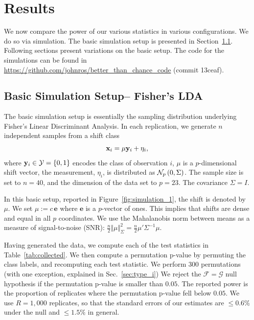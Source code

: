 \documentclass[oupdraft]{bio}
\begin{document}
\section{Results}
\label{sec:results}
We now compare the power of our various statistics in various configurations. 
We do so via simulation.
The basic simulation setup is presented in Section~\ref{sec:simulation_details}.
Following sections present variations on the basic setup.
The \R code for the simulations can be found in \url{https://github.com/johnros/better_than_chance_code} (commit 13ceaf).


\subsection{Basic Simulation Setup-- Fisher's LDA}
\label{sec:simulation_details}

The basic simulation setup is essentially the sampling distribution underlying Fisher's Linear Discriminant Analysis. 
In each replication, we generate $n$ independent samples from a shift class 
\begin{align}
\label{eq:distribution}
\mathbf{x}_i = \mu \mathbf{y}_i + \eta_i,
\end{align}
where $\mathbf{y}_i \in \mathcal{Y}=\{ 0,1 \}$ encodes the class of observation $i$, $\mu$ is a $p$-dimensional shift vector, the measurement, $\eta_i$, is distributed as $\mathcal{N}_{p}\left(0,\Sigma\right)$.
The sample size is set to $n=40$, and the dimension of the data set to $p=23$. 
The covariance $\Sigma=I$. 

In this basic setup, reported in Figure~\ref{fig:simulation_1}, the shift is denoted by $\mu$. 
We set $\mu:=c \, \textbf{e}$ where $\textbf{e}$ is a $p$-vector of ones. 
This implies that shifts are dense and equal in all $p$ coordinates.
We use the Mahalanobis norm between means as a measure of signal-to-noise (SNR): 
$\frac{n}{2}\Vert \mu \Vert_\Sigma^2=\frac{n}{2} \mu' \Sigma^{-1} \mu$.

Having generated the data, we compute each of the test statistics in Table~\ref{tab:collected}.
We then compute a permutation p-value by permuting the class labels, and recomputing each test statistic. 
We perform $300$ permutations (with one exception, explained in Sec.~\ref{sec:type_i})
We reject the $\mathcal{F}=\mathcal{G}$ null hypothesis if the permutation p-value is smaller than $0.05$.
The reported power is the proportion of replicates where the permutation p-value fell below $0.05$.
We use $R=1,000$  replicates, so that the standard errors of our estimates are $\leq0.6\%$ under the null and $\leq1.5\%$ in general. 
\end{document}
